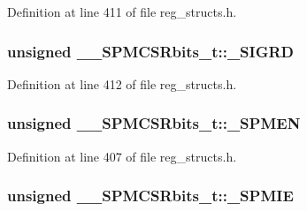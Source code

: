Definition at line 411 of file reg\+\_\+structs.\+h.

\hypertarget{union_____s_p_m_c_s_rbits__t_a41af35ec5da945ebabd68a3b0433a2c1}{
\subsubsection[{\+\_\+\+S\+I\+G\+R\+D}]{\setlength{\rightskip}{0pt plus 5cm}unsigned \+\_\+\+\_\+\+S\+P\+M\+C\+S\+Rbits\+\_\+t\+::\+\_\+\+S\+I\+G\+R\+D}}\label{union_____s_p_m_c_s_rbits__t_a41af35ec5da945ebabd68a3b0433a2c1}


Definition at line 412 of file reg\+\_\+structs.\+h.

\hypertarget{union_____s_p_m_c_s_rbits__t_a7334ff7a44cea22a3ccb71c298e6b1d6}{
\subsubsection[{\+\_\+\+S\+P\+M\+E\+N}]{\setlength{\rightskip}{0pt plus 5cm}unsigned \+\_\+\+\_\+\+S\+P\+M\+C\+S\+Rbits\+\_\+t\+::\+\_\+\+S\+P\+M\+E\+N}}\label{union_____s_p_m_c_s_rbits__t_a7334ff7a44cea22a3ccb71c298e6b1d6}


Definition at line 407 of file reg\+\_\+structs.\+h.

\hypertarget{union_____s_p_m_c_s_rbits__t_a1a9a86babff2cf8c67f7b03a0fc62eba}{
\subsubsection[{\+\_\+\+S\+P\+M\+I\+E}]{\setlength{\rightskip}{0pt plus 5cm}unsigned \+\_\+\+\_\+\+S\+P\+M\+C\+S\+Rbits\+\_\+t\+::\+\_\+\+S\+P\+M\+I\+E}}\label{union_____s_p_m_c_s_rbits__t_a1a9a86babff2cf8c67f7b03a0fc62eba}


